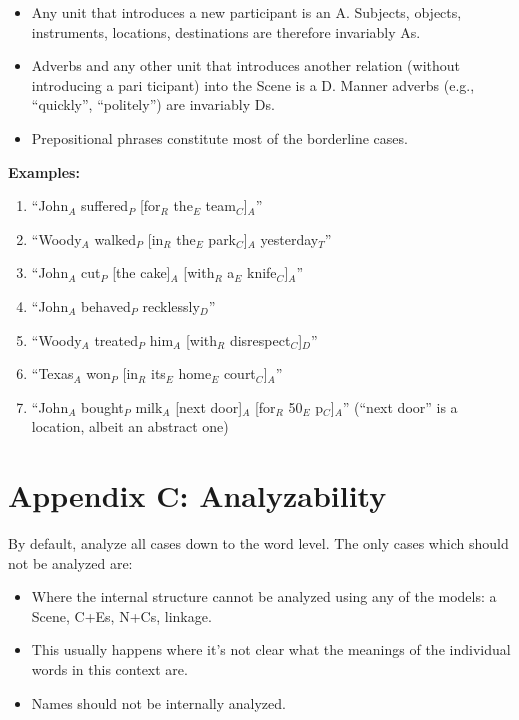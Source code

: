 \documentclass[11pt]{article}
\begin{document}
\begin{itemize}
\item
Any unit that introduces a new participant is an A. Subjects, objects, instruments, locations, destinations are therefore invariably As.
\item
Adverbs and any other unit that introduces another relation (without introducing a pari ticipant) into the Scene is a D. Manner adverbs (e.g., ``quickly'', ``politely'') are invariably Ds.
\item
Prepositional phrases constitute most of the borderline cases.
\end{itemize}


{\bf Examples:}

\begin{enumerate}
\item
``John$_A$ suffered$_P$ [for$_R$ the$_E$ team$_C$]$_A$''
\item
``Woody$_A$ walked$_P$ [in$_R$ the$_E$ park$_C$]$_A$ yesterday$_T$''
\item
``John$_A$ cut$_P$ [the cake]$_A$ [with$_R$ a$_E$ knife$_C$]$_A$''
\item
``John$_A$ behaved$_P$ recklessly$_D$''
\item
``Woody$_A$ treated$_P$ him$_A$ [with$_R$ disrespect$_C$]$_D$''
\item
``Texas$_A$ won$_P$ [in$_R$ its$_E$ home$_E$ court$_C$]$_A$''
\item
``John$_A$ bought$_P$ milk$_A$ [next door]$_A$ [for$_R$ 50$_E$ p$_C$]$_A$'' (``next door'' is a location, albeit an abstract one)
\end{enumerate}


\section{\large Appendix C: Analyzability}

By default, analyze all cases down to the word level.
The only cases which should not be analyzed are:

\begin{itemize}
\item
Where the internal structure cannot be analyzed using any of the models: a Scene, C+Es, N+Cs, linkage.
\item
This usually happens where it's not clear what the meanings of the individual words in this context are.
\item
Names should not be internally analyzed.
\end{itemize}
\end{document}
